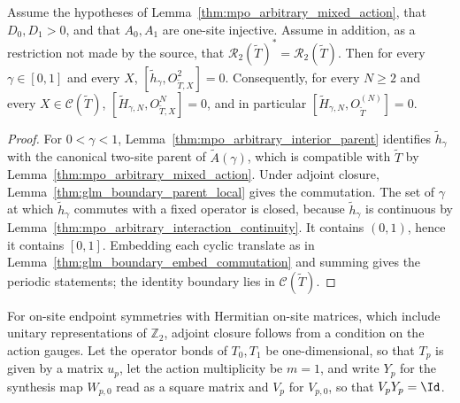 \begin{lemma}
    \label{thm:mpo_arbitrary_parent_commutation_adjoint_closed}
    \leanok
    Assume the hypotheses of Lemma~\ref{thm:mpo_arbitrary_mixed_action},
    that $D_0,D_1>0$, and that $A_0,A_1$ are one-site injective. Assume
    in addition, as a restriction not made by the source, that
    $\mathcal R_2(\widetilde T)^*=\mathcal R_2(\widetilde T)$. Then for
    every $\gamma\in[0,1]$ and every $X$,
    $[\widetilde h_\gamma,O^2_{\widetilde T,X}]=0$. Consequently, for
    every $N\geq2$ and every $X\in\mathcal C(\widetilde T)$,
    $[\widetilde H_{\gamma,N},O^N_{\widetilde T,X}]=0$, and in particular
    $[\widetilde H_{\gamma,N},O^{(N)}_{\widetilde T}]=0$.
\end{lemma}
\begin{proof}
    \leanok
    For $0<\gamma<1$, Lemma~\ref{thm:mpo_arbitrary_interior_parent}
    identifies $\widetilde h_\gamma$ with the canonical two-site parent
    of $\widetilde A(\gamma)$, which is compatible with $\widetilde T$ by
    Lemma~\ref{thm:mpo_arbitrary_mixed_action}. Under adjoint closure,
    Lemma~\ref{thm:glm_boundary_parent_local} gives the commutation.
    The set of $\gamma$ at which $\widetilde h_\gamma$ commutes with a
    fixed operator is closed, because $\widetilde h_\gamma$ is continuous
    by Lemma~\ref{thm:mpo_arbitrary_interaction_continuity}. It contains
    $(0,1)$, hence it contains $[0,1]$. Embedding each cyclic translate as
    in Lemma~\ref{thm:glm_boundary_embed_commutation} and summing gives
    the periodic statements; the identity boundary lies in
    $\mathcal C(\widetilde T)$.
\end{proof}

For on-site endpoint symmetries with Hermitian on-site matrices, which
include unitary representations of $\mathbb Z_2$, adjoint closure follows from
a condition on the action gauges. Let the operator bonds of $T_0,T_1$ be
one-dimensional, so that $T_p$ is given by a matrix $u_p$, let the action
multiplicity be $m=1$, and write $Y_p$ for the synthesis map $W_{p,0}$ read
as a square matrix and $V_p$ for $V_{p,0}$, so that $V_pY_p=\Id$.


